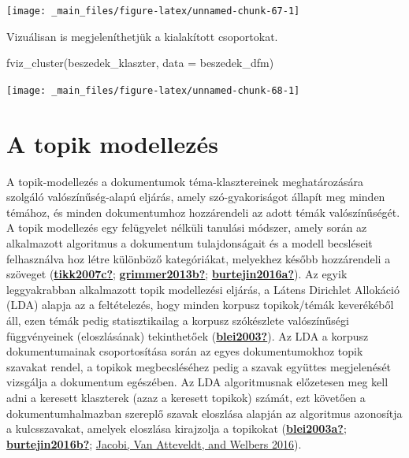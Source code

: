 \documentclass[
]{book}
\newenvironment{Shaded}{\begin{snugshade}}{\end{snugshade}}
\newcommand{\AttributeTok}[1]{\textcolor[rgb]{0.77,0.63,0.00}{#1}}
\newcommand{\FunctionTok}[1]{\textcolor[rgb]{0.00,0.00,0.00}{#1}}
\newcommand{\NormalTok}[1]{#1}
\begin{document}
\begin{center}\texttt{[image: \_main\_files/figure-latex/unnamed-chunk-67-1]} \end{center}

Vizuálisan is megjeleníthetjük a kialakított csoportokat.

\begin{Shaded}
\begin{Highlighting}[]
\FunctionTok{fviz\_cluster}\NormalTok{(beszedek\_klaszter, }\AttributeTok{data =}\NormalTok{ beszedek\_dfm)}
\end{Highlighting}
\end{Shaded}

\begin{center}\texttt{[image: \_main\_files/figure-latex/unnamed-chunk-68-1]} \end{center}

\hypertarget{a-topik-modellezuxe9s}{%
\section{A topik modellezés}\label{a-topik-modellezuxe9s}}

A topik-modellezés a dokumentumok téma-klasztereinek meghatározására
szolgáló valószínűség-alapú eljárás, amely szó-gyakoriságot állapít meg
minden témához, és minden dokumentumhoz hozzárendeli az adott témák
valószínűségét. A topik modellezés egy felügyelet nélküli tanulási
módszer, amely során az alkalmazott algoritmus a dokumentum
tulajdonságait és a modell becsléseit felhasználva hoz létre különböző
kategóriákat, melyekhez később hozzárendeli a szöveget
(\protect\hyperlink{ref-tikk2007c}{\textbf{tikk2007c?}};
\protect\hyperlink{ref-grimmer2013b}{\textbf{grimmer2013b?}};
\protect\hyperlink{ref-burtejin2016a}{\textbf{burtejin2016a?}}). Az
egyik leggyakrabban alkalmazott topik modellezési eljárás, a Látens
Dirichlet Allokáció (LDA) alapja az a feltételezés, hogy minden korpusz
topikok/témák keverékéből áll, ezen témák pedig statisztikailag a
korpusz szókészlete valószínűségi függvényeinek (eloszlásának)
tekinthetőek (\protect\hyperlink{ref-blei2003}{\textbf{blei2003?}}). Az
LDA a korpusz dokumentumainak csoportosítása során az egyes
dokumentumokhoz topik szavakat rendel, a topikok megbecsléséhez pedig a
szavak együttes megjelenését vizsgálja a dokumentum egészében. Az LDA
algoritmusnak előzetesen meg kell adni a keresett klaszterek (azaz a
keresett topikok) számát, ezt követően a dokumentumhalmazban szereplő
szavak eloszlása alapján az algoritmus azonosítja a kulcsszavakat,
amelyek eloszlása kirajzolja a topikokat
(\protect\hyperlink{ref-blei2003a}{\textbf{blei2003a?}};
\protect\hyperlink{ref-burtejin2016b}{\textbf{burtejin2016b?}};
\protect\hyperlink{ref-jacobi2016}{Jacobi, Van Atteveldt, and Welbers
2016}).
\end{document}
